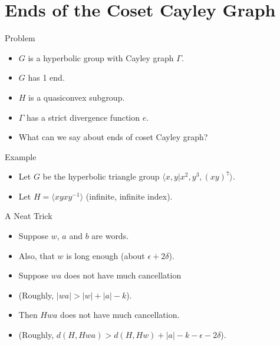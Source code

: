 \documentclass{beamer}
\begin{document}
\section{Ends of the Coset Cayley Graph}

\begin{frame}{Problem}
	\begin{itemize}
		\item $G$ is a hyperbolic group with Cayley graph $\Gamma$.
		\item $G$ has 1 end.
		\item $H$ is a quasiconvex subgroup.
		\item $\Gamma$ has a strict divergence function $e$.
		\item What can we say about ends of coset Cayley graph?
	\end{itemize}
\end{frame}

\begin{frame}{Example}
	\begin{itemize}
		\item Let $G$ be the hyperbolic triangle group $\langle x, y|x^2, y^3, (xy)^7 \rangle$.
		\item Let $H = \langle xyxy^{-1} \rangle$ (infinite, infinite index).
		\pause
		\begin{figure}
		
		\end{figure}
	\end{itemize}
\end{frame}

\begin{frame}{A Neat Trick}
	\begin{itemize}
		\item Suppose $w$, $a$ and $b$ are words.
		\item Also, that $w$ is long enough (about $\epsilon+2\delta$).
		\pause
		\item Suppose $wa$ does not have much cancellation
		\item (Roughly, $|wa| > |w| + |a| - k$).
		\pause
		\item Then $Hwa$ does not have much cancellation.
		\item (Roughly, $d(H, Hwa) > d(H, Hw) + |a| - k - \epsilon - 2\delta$).
	\end{itemize}
\end{frame}
\end{document}
